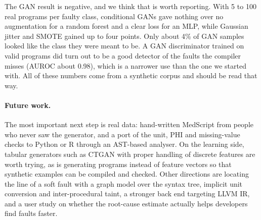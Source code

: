 \documentclass[12pt,a4paper]{article}
\begin{document}
The GAN result is negative, and we think that is worth reporting. With 5 to 100 real programs per faulty class,
conditional GANs gave nothing over no augmentation for a random forest and a clear loss for an MLP, while Gaussian jitter
and SMOTE gained up to four points. Only about 4\% of GAN samples looked like the class they were meant to be. A GAN
discriminator trained on valid programs did turn out to be a good detector of the faults the compiler misses (AUROC about
0.98), which is a narrower use than the one we started with. All of these numbers come from a synthetic corpus and should
be read that way.

\paragraph{Future work.} The most important next step is real data: hand-written MedScript from people who never saw the
generator, and a port of the unit, PHI and missing-value checks to Python or R through an AST-based analyser. On the
learning side, tabular generators such as CTGAN with proper handling of discrete features are worth trying, as is
generating programs instead of feature vectors so that synthetic examples can be compiled and checked. Other directions
are locating the line of a soft fault with a graph model over the syntax tree, implicit unit conversion and
inter-procedural taint, a stronger back end targeting LLVM IR, and a user study on whether the root-cause estimate
actually helps developers find faults faster.
\end{document}
